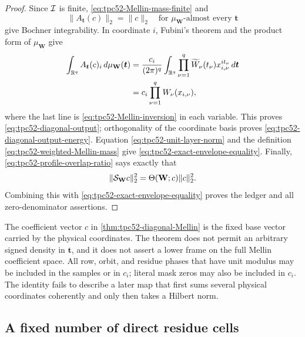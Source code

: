 \begin{proof}
Since \(\mathcal I\) is finite, \eqref{eq:tpc52-Mellin-mass-finite} and
\begin{equation}
 \|A_{\bm t}(c)\|_2=\|c\|_2
 \quad\text{for }\mu_{\mathbf W}\text{-almost every }\bm t
 \label{eq:tpc52-unit-layer-norm}
\end{equation}
give Bochner integrability.  In coordinate \(i\), Fubini's theorem and
the product form of \(\mu_{\mathbf W}\) give
\begin{align}
 \int_{\mathbb R^q}A_{\bm t}(c)_i\,
      d\mu_{\mathbf W}(\bm t)
 &=\frac{c_i}{(2\pi)^q}
   \int_{\mathbb R^q}\prod_{\nu=1}^q
     \widetilde W_\nu(t_\nu)x_{i,\nu}^{it_\nu}
     \,d\bm t\notag\\
 &=c_i\prod_{\nu=1}^qW_\nu(x_{i,\nu}),
 \label{eq:tpc52-coordinatewise-Mellin-inversion}
\end{align}
where the last line is \eqref{eq:tpc52-Mellin-inversion} in each
variable.  This proves \eqref{eq:tpc52-diagonal-output}; orthogonality
of the coordinate basis proves
\eqref{eq:tpc52-diagonal-output-energy}.  Equation
\eqref{eq:tpc52-unit-layer-norm} and the definition
\eqref{eq:tpc52-weighted-Mellin-mass} give
\eqref{eq:tpc52-exact-envelope-equality}.  Finally,
\eqref{eq:tpc52-profile-overlap-ratio} says exactly that
\begin{equation}
 \|\mathcal S_{\mathbf W}c\|_2^2
 =\Theta(\mathbf W;c)\|c\|_2^2.
 \label{eq:tpc52-output-as-overlap}
\end{equation}
Combining this with \eqref{eq:tpc52-exact-envelope-equality} proves
the ledger and all zero-denominator assertions.
\end{proof}

\begin{remark}
\label{rem:tpc52-diagonal-identity-scope}
The coefficient vector \(c\) in
\cref{thm:tpc52-diagonal-Mellin} is the fixed base vector carried by
the physical coordinates.  The theorem does not permit an arbitrary
signed density in \(\bm t\), and it does not assert a lower frame on
the full Mellin coefficient space.  All row, orbit, and residue phases
that have unit modulus may be included in the samples or in \(c_i\);
literal mask zeros may also be included in \(c_i\).  The identity
fails to describe a later map that first sums several physical
coordinates coherently and only then takes a Hilbert norm.
\end{remark}

\subsection{A fixed number of direct residue cells}

